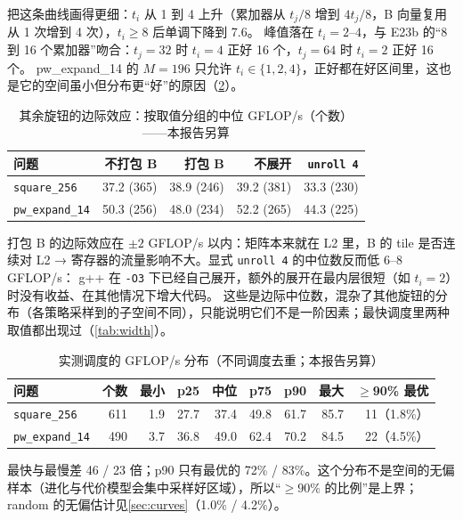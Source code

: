 \documentclass[11pt,a4paper]{ctexart}
\newcommand{\sk}[1]{\texttt{#1}}
\begin{document}
 把这条曲线画得更细：$t_i$ 从 1 到 4 上升（累加器从 $t_j/8$ 增到 $4t_j/8$，B 向量复用从 1 次增到 4 次），$t_i\ge8$ 后单调下降到 7.6。
峰值落在 $t_i=2$--$4$，与 E23b 的“8 到 16 个累加器”吻合：$t_j=32$ 时 $t_i=4$ 正好 16 个，$t_j=64$ 时 $t_i=2$ 正好 16 个。
pw\_expand\_14 的 $M=196$ 只允许 $t_i\in\{1,2,4\}$，正好都在好区间里，这也是它的空间虽小但分布更“好”的原因（\cref{tab:dist}）。

\begin{table}[H]
\centering\small
\caption{其余旋钮的边际效应：按取值分组的中位 GFLOP/s（个数）——本报告另算}\label{tab:knobeffect}
\begin{tabular}{lrrrr}
\toprule
问题 & 不打包 B & 打包 B & 不展开 & \texttt{unroll 4} \\
\midrule
\sk{square\_256} & 37.2 (365) & 38.9 (246) & 39.2 (381) & 33.3 (230) \\
\sk{pw\_expand\_14} & 50.3 (256) & 48.0 (234) & 52.2 (265) & 44.3 (225) \\
\bottomrule
\end{tabular}
\end{table}

打包 B 的边际效应在 $\pm2$ GFLOP/s 以内：矩阵本来就在 L2 里，B 的 tile 是否连续对 L2 → 寄存器的流量影响不大。显式 \texttt{unroll 4} 的中位数反而低 6--8 GFLOP/s：
g++ 在 \texttt{-O3} 下已经自己展开，额外的展开在最内层很短（如 $t_i=2$）时没有收益、在其他情况下增大代码。
这些是边际中位数，混杂了其他旋钮的分布（各策略采样到的子空间不同），只能说明它们不是一阶因素；最快调度里两种取值都出现过（\cref{tab:width}）。

\begin{table}[H]
\centering\small
\caption{实测调度的 GFLOP/s 分布（不同调度去重；本报告另算）}\label{tab:dist}
\begin{tabular}{lrrrrrrrr}
\toprule
问题 & 个数 & 最小 & p25 & 中位 & p75 & p90 & 最大 & $\ge$90\% 最优 \\
\midrule
\sk{square\_256} & 611 & 1.9 & 27.7 & 37.4 & 49.8 & 61.7 & 85.7 & 11（1.8\%） \\
\sk{pw\_expand\_14} & 490 & 3.7 & 36.8 & 49.0 & 62.4 & 70.2 & 84.5 & 22（4.5\%） \\
\bottomrule
\end{tabular}
\end{table}

最快与最慢差 46 / 23 倍；p90 只有最优的 72\% / 83\%。这个分布不是空间的无偏样本（进化与代价模型会集中采样好区域），所以“$\ge90\%$ 的比例”是上界；
random 的无偏估计见\cref{sec:curves}（1.0\% / 4.2\%）。
\end{document}

